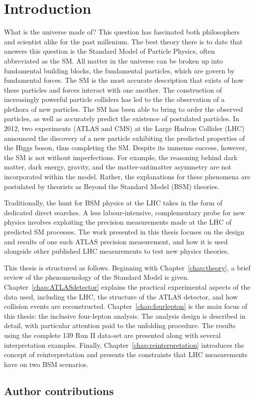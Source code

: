 \chapter{Introduction}
\label{chap:intro}
What is the universe made of? This question has fascinated both philosophers and scientist alike for the past millenium. The best theory there is to date that answers this question is the Standard Model of Particle Physics, often abbreviated as the SM. All matter in the universe can be broken up into fundamental building blocks, the fundamental particles, which are govern by fundamental forces. The SM is the most accurate description that exists of how these particles and forces interact with one another. The construction of increasingly powerful particle colliders has led to the the observation of a plethora of new particles. The SM has been able to bring to order the observed particles, as well as accurately predict the existence of postulated particles. In 2012, two experiments (ATLAS and CMS) at the Large Hadron Collider (LHC) announced the discovery of a new particle exhibiting the predicted properties of the Higgs boson, thus completing the SM. Despite its immense success, however, the SM is not without imperfections. For example, the reasoning behind dark matter, dark energy, gravity, and the matter-antimatter asymmetry are not incorporated within the model. Rather, the explanations for these phenomena are postulated by theorists as Beyond the Standard Model (BSM) theories. 

Traditionally, the hunt for BSM physics at the LHC takes in the form of dedicated direct searches. A less labour-intensive, complementary probe for new physics involves exploiting the precision measurements made at the LHC of predicted SM processes. The work presented in this thesis focuses on the design and results of one such ATLAS precision measurement, and how it is used alongside other published LHC measurements to test new physics theories.

This thesis is structured as follows. Beginning with Chapter~\ref{chap:theory}, a brief review of the phenomenology of the Standard Model is given. Chapter~\ref{chap:ATLASdetector} explains the practical experimental aspects of the data used, including the LHC, the structure of the ATLAS detector, and how collision events are reconstructed. Chapter~\ref{chap:fourlepton} is the main focus of this thesis: the \ATLAS inclusive four-lepton analysis. The analysis design is described in detail, with particular attention paid to the unfolding procedure. The results using the complete \unit{139}{\invfb} Run II data-set are presented along with several interpretation examples. Finally, Chapter~\ref{chap:reinterpretation} introduces the concept of reinterpretation and presents the constraints that LHC measurements have on two BSM scenarios. 

\section{Author contributions}


